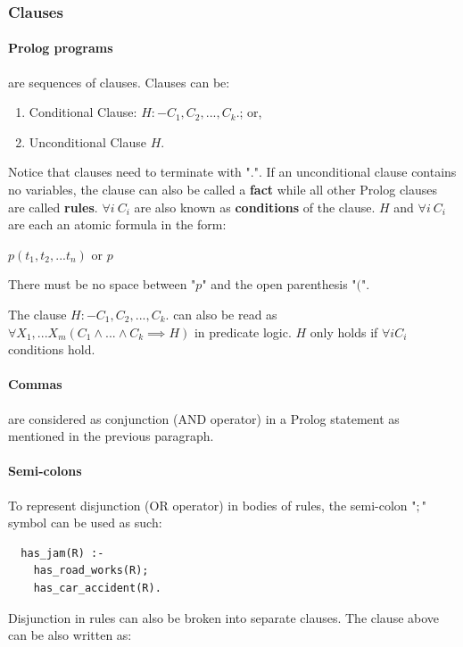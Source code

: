 \documentclass{article}
\begin{document}
\begin{multicols}{2}
  \subsubsection{Clauses}
  
  \paragraph{Prolog programs} are sequences of clauses. Clauses can be:
  
  \begin{enumerate}
  \item Conditional Clause: $H :- C_1, C_2, ..., C_k.$; or,
  \item Unconditional Clause $H.$
  \end{enumerate}
  
  \noindent Notice that clauses need to terminate with "$.$". If an unconditional clause contains no variables, the clause can also be called a {\bf fact} while all other Prolog clauses are called {\bf rules}. $\forall i\ C_i$ are also known as {\bf conditions} of the clause. $H$ and $\forall i\ C_i$ are each an atomic formula in the form:
  
  $p(t_1, t_2, ... t_n)$ or $p$
  
  \noindent There must be no space between "$p$" and the open parenthesis "$($".
  
  The clause $H :- C_1, C_2, ..., C_k.$ can also be read as $\forall X_1, ... X_m (C_1 \land ... \land C_k \implies H)$ in predicate logic. $H$ only holds if $\forall i C_i$ conditions hold.
  
  \paragraph{Commas} are considered as conjunction (AND operator) in a Prolog statement as mentioned in the previous paragraph.
  
  \paragraph{Semi-colons} To represent disjunction (OR operator) in bodies of rules, the semi-colon "$;$" symbol can be used as such:
  
  \begin{lstlisting}
  has_jam(R) :-
    has_road_works(R);
    has_car_accident(R).
  \end{lstlisting}
  
  Disjunction in rules can also be broken into separate clauses. The clause above can be also written as:
  

\end{multicols}
\end{document}
